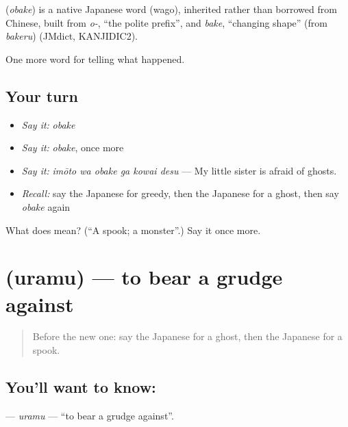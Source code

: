 \begin{cousinweb}
\textbf{} (\emph{obake}) is a native Japanese word (wago), inherited rather than borrowed from Chinese, built from \emph{o-}, \textquotedblleft{}the polite prefix\textquotedblright{}, and \emph{bake}, \textquotedblleft{}changing shape\textquotedblright{} (from \emph{bakeru}) (JMdict, KANJIDIC2).
\end{cousinweb}

\begin{grammarlens}[title={What you've built}]
One more word for telling what happened.
\end{grammarlens}

\subsection*{Your turn}
\begin{itemize}
\raggedright
  \item \emph{Say it:} \emph{obake}
  \item \emph{Say it:} \emph{obake}, once more
  \item \emph{Say it:} \emph{imōto wa obake ga kowai desu} — My little sister is afraid of ghosts.
  \item \emph{Recall:} say the Japanese for greedy, then the Japanese for a ghost, then say \emph{obake} again
\end{itemize}

\begin{tcolorbox}[breakable,colback=teal!4,colframe=teal!35!black,title={Before you move on}]
What does  mean? (\textquotedblleft{}A spook; a monster\textquotedblright{}.) Say it once more.
\end{tcolorbox}
\section[\texorpdfstring{\ja{うらむ} (uramu)}{うらむ (uramu)}]{ (uramu) — to bear a grudge against}

\label{lesson:JA-C302-uramu}



\begin{quote}
Before the new one: say the Japanese for a ghost, then the Japanese for a spook.
\end{quote}

\subsection*{You'll want to know: }
\textbf{} — \emph{uramu} — \textquotedblleft{}to bear a grudge against\textquotedblright{}.

